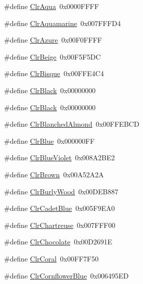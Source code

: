 \begin{DoxyCompactItemize}
\#define \hyperlink{group__primitives__api_ga87cfae4a204e84e4aa7cd4d93a044892}{Clr\+Aqua}~0x0000\+F\+F\+F\+F
\item 
\#define \hyperlink{group__primitives__api_ga11744daacf236bbcd2e964587746f808}{Clr\+Aquamarine}~0x007\+F\+F\+F\+D4
\item 
\#define \hyperlink{group__primitives__api_gae2426904f281372116820c15c6c93232}{Clr\+Azure}~0x00\+F0\+F\+F\+F\+F
\item 
\#define \hyperlink{group__primitives__api_gaf9beafebe07cdd556c090bad82783b18}{Clr\+Beige}~0x00\+F5\+F5\+D\+C
\item 
\#define \hyperlink{group__primitives__api_ga0eaf6039bf2da207ea242709495e4700}{Clr\+Bisque}~0x00\+F\+F\+E4\+C4
\item 
\#define \hyperlink{group__primitives__api_gae68bd8966702128d6463b92d24b5b66b}{Clr\+Black}~0x00000000
\item 
\#define \hyperlink{group__primitives__api_gae68bd8966702128d6463b92d24b5b66b}{Clr\+Black}~0x00000000
\item 
\#define \hyperlink{group__primitives__api_ga25e1b8dc7e59506b1a1b5e52bf839167}{Clr\+Blanched\+Almond}~0x00\+F\+F\+E\+B\+C\+D
\item 
\#define \hyperlink{group__primitives__api_ga3eea8955621090cfcea422248ac96017}{Clr\+Blue}~0x000000\+F\+F
\item 
\#define \hyperlink{group__primitives__api_ga101a21ed98e3ad3d1eb8678ff95b5313}{Clr\+Blue\+Violet}~0x008\+A2\+B\+E2
\item 
\#define \hyperlink{group__primitives__api_ga15b2e355a7959b5d5acc73665f3fcd08}{Clr\+Brown}~0x00\+A52\+A2\+A
\item 
\#define \hyperlink{group__primitives__api_gaa3c8f9d0ecf34337983dabb0015fdb3e}{Clr\+Burly\+Wood}~0x00\+D\+E\+B887
\item 
\#define \hyperlink{group__primitives__api_ga7dd514a42eb27b916a9597508c4f1f8d}{Clr\+Cadet\+Blue}~0x005\+F9\+E\+A0
\item 
\#define \hyperlink{group__primitives__api_ga80f014f08e40b8d258b3294e9461e45a}{Clr\+Chartreuse}~0x007\+F\+F\+F00
\item 
\#define \hyperlink{group__primitives__api_ga422164b1351b847858ef55d3b7be69ea}{Clr\+Chocolate}~0x00\+D2691\+E
\item 
\#define \hyperlink{group__primitives__api_ga14831d170f775fa6a200d9bf02b10190}{Clr\+Coral}~0x00\+F\+F7\+F50
\item 
\#define \hyperlink{group__primitives__api_ga2154284c30a3f0803fbf3499f0078a4f}{Clr\+Cornflower\+Blue}~0x006495\+E\+D

\end{DoxyCompactItemize}
